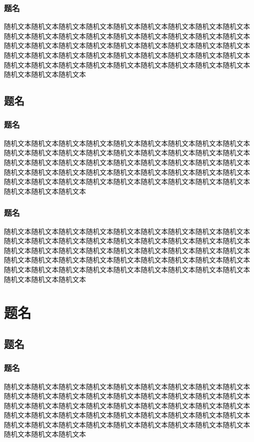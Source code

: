 \documentclass{paper}
\begin{document}
\subsubsection{题名}
随机文本随机文本随机文本随机文本随机文本随机文本随机文本随机文本随机文本随机文本随机文本随机文本随机文本随机文本随机文本随机文本随机文本随机文本随机文本随机文本随机文本随机文本随机文本随机文本随机文本随机文本随机文本随机文本随机文本随机文本随机文本随机文本随机文本随机文本随机文本随机文本随机文本随机文本随机文本随机文本随机文本随机文本随机文本随机文本随机文本随机文本随机文本随机文本
\subsection{题名}
\subsubsection{题名}
随机文本随机文本随机文本随机文本随机文本随机文本随机文本随机文本随机文本随机文本随机文本随机文本随机文本随机文本随机文本随机文本随机文本随机文本随机文本随机文本随机文本随机文本随机文本随机文本随机文本随机文本随机文本随机文本随机文本随机文本随机文本随机文本随机文本随机文本随机文本随机文本随机文本随机文本随机文本随机文本随机文本随机文本随机文本随机文本随机文本随机文本随机文本随机文本
\subsubsection{题名}
随机文本随机文本随机文本随机文本随机文本随机文本随机文本随机文本随机文本随机文本随机文本随机文本随机文本随机文本随机文本随机文本随机文本随机文本随机文本随机文本随机文本随机文本随机文本随机文本随机文本随机文本随机文本随机文本随机文本随机文本随机文本随机文本随机文本随机文本随机文本随机文本随机文本随机文本随机文本随机文本随机文本随机文本随机文本随机文本随机文本随机文本随机文本随机文本


\section{题名}
\subsection{题名}
\subsubsection{题名}
随机文本随机文本随机文本随机文本随机文本随机文本随机文本随机文本随机文本随机文本随机文本随机文本随机文本随机文本随机文本随机文本随机文本随机文本随机文本随机文本随机文本随机文本随机文本随机文本随机文本随机文本随机文本随机文本随机文本随机文本随机文本随机文本随机文本随机文本随机文本随机文本随机文本随机文本随机文本随机文本随机文本随机文本随机文本随机文本随机文本随机文本随机文本随机文本
\end{document}
